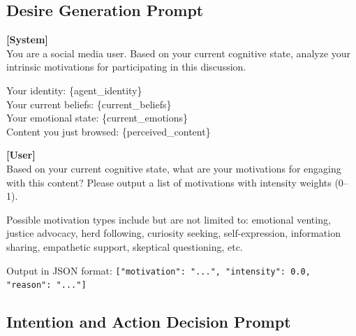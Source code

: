 \documentclass[a4paper,fleqn]{cas-dc}
\begin{document}
\subsection{Desire Generation Prompt}

\begin{promptbox}
\small
\textbf{[System]}\\
You are a social media user. Based on your current cognitive state, analyze your intrinsic motivations for participating in this discussion.

Your identity: \{agent\_identity\}\\
Your current beliefs: \{current\_beliefs\}\\
Your emotional state: \{current\_emotions\}\\
Content you just browsed: \{perceived\_content\}

\textbf{[User]}\\
Based on your current cognitive state, what are your motivations for engaging with this content? Please output a list of motivations with intensity weights (0--1).

Possible motivation types include but are not limited to: emotional venting, justice advocacy, herd following, curiosity seeking, self-expression, information sharing, empathetic support, skeptical questioning, etc.

Output in JSON format:
\texttt{[{"motivation": "...", "intensity": 0.0, "reason": "..."}]}
\end{promptbox}

\subsection{Intention and Action Decision Prompt}
\end{document}
